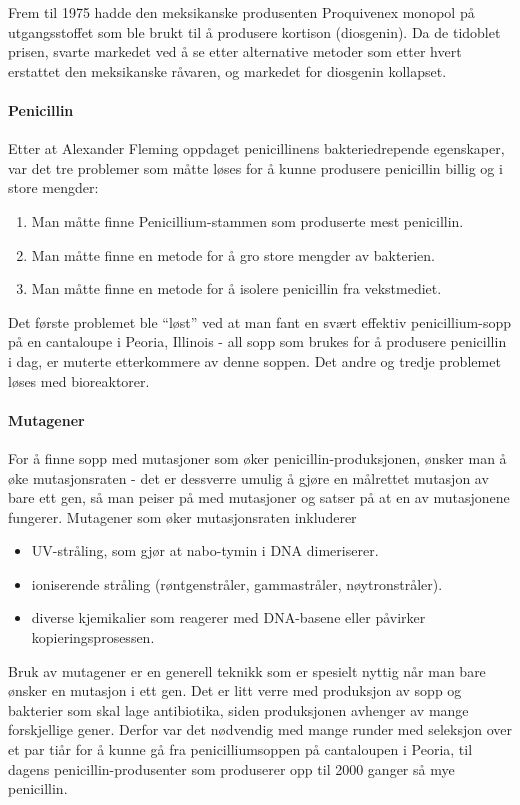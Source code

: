 Frem til 1975 hadde den meksikanske produsenten Proquivenex monopol på utgangsstoffet som ble brukt til å produsere kortison (diosgenin). Da de tidoblet prisen, svarte markedet ved å se etter alternative metoder som etter hvert erstattet den meksikanske råvaren, og markedet for diosgenin kollapset.

\paragraph{Penicillin} Etter at Alexander Fleming oppdaget penicillinens bakteriedrepende egenskaper, var det tre problemer som måtte løses for å kunne produsere penicillin billig og i store mengder:
\begin{enumerate}
	\item Man måtte finne Penicillium-stammen som produserte mest penicillin.
	\item Man måtte finne en metode for å gro store mengder av bakterien.
	\item Man måtte finne en metode for å isolere penicillin fra vekstmediet.
\end{enumerate}
Det første problemet ble ``løst'' ved at man fant en svært effektiv penicillium-sopp på en cantaloupe i Peoria, Illinois - all sopp som brukes for å produsere penicillin i dag, er muterte etterkommere av denne soppen. Det andre og tredje problemet løses med bioreaktorer.

\paragraph{Mutagener} For å finne sopp med mutasjoner som øker penicillin-produksjonen, ønsker man å øke mutasjonsraten - det er dessverre umulig å gjøre en målrettet mutasjon av bare ett gen, så man peiser på med mutasjoner og satser på at en av mutasjonene fungerer. Mutagener som øker mutasjonsraten inkluderer
\begin{itemize}[nolistsep,noitemsep]
	\item UV-stråling, som gjør at nabo-tymin i DNA dimeriserer.
	\item ioniserende stråling (røntgenstråler, gammastråler, nøytronstråler).
	\item diverse kjemikalier som reagerer med DNA-basene eller påvirker kopieringsprosessen.
\end{itemize}
Bruk av mutagener er en generell teknikk som er spesielt nyttig når man bare ønsker en mutasjon i ett gen. Det er litt verre med produksjon av sopp og bakterier som skal lage antibiotika, siden produksjonen avhenger av mange forskjellige gener. Derfor var det nødvendig med mange runder med seleksjon over et par tiår for å kunne gå fra penicilliumsoppen på cantaloupen i Peoria, til dagens penicillin-produsenter som produserer opp til 2000 ganger så mye penicillin. 

